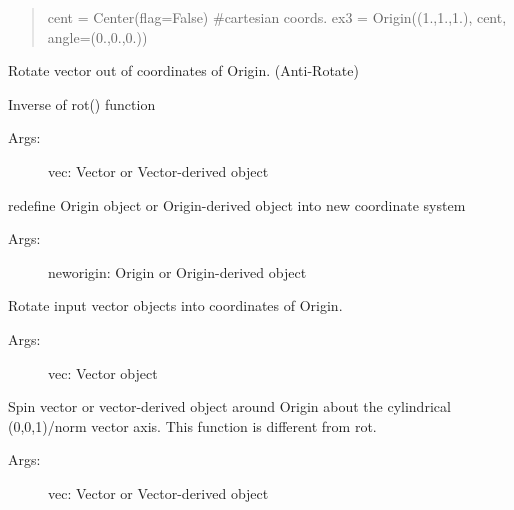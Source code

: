 \documentclass[letterpaper,10pt,english]{sphinxmanual}
\begin{document}
\begin{fulllineitems}
\begin{description}
\begin{quote}
cent = Center(flag=False) \#cartesian coords.
ex3 = Origin((1.,1.,1.), cent, angle=(0.,0.,0.))
\end{quote}

\end{description}

\begin{fulllineitems}
\label{TRIPPy:TRIPPy.geometry.Origin.arot}
Rotate vector out of coordinates of Origin.
(Anti-Rotate)

Inverse of rot() function
\begin{description}
\item[{Args:}] \leavevmode
vec: Vector or Vector-derived object

\end{description}

\end{fulllineitems}


\begin{fulllineitems}
\label{TRIPPy:TRIPPy.geometry.Origin.redefine}
redefine Origin object or Origin-derived object
into new coordinate system
\begin{description}
\item[{Args:}] \leavevmode
neworigin: Origin or Origin-derived object

\end{description}

\end{fulllineitems}


\begin{fulllineitems}
\label{TRIPPy:TRIPPy.geometry.Origin.rot}
Rotate input vector objects into coordinates of Origin.
\begin{description}
\item[{Args:}] \leavevmode
vec: Vector object

\end{description}

\end{fulllineitems}


\begin{fulllineitems}
\label{TRIPPy:TRIPPy.geometry.Origin.spin}
Spin vector or vector-derived object around Origin
about the cylindrical (0,0,1)/norm vector axis. This function
is different from rot.
\begin{description}
\item[{Args:}] \leavevmode
vec: Vector or Vector-derived object


\end{description}
\end{fulllineitems}
\end{fulllineitems}
\end{document}
